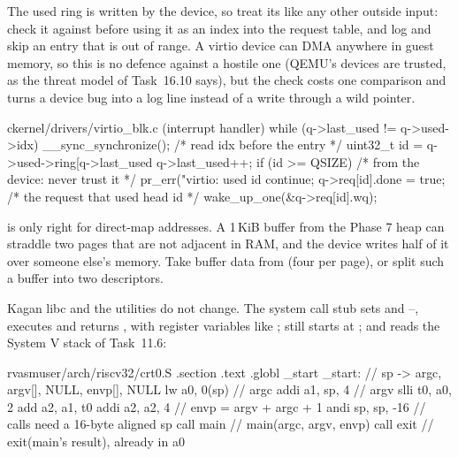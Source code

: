 \documentclass[11pt,a4paper]{article}
\begin{document}
The used ring is written by the device, so treat its  like any other outside input: check it against
 before using it as an index into the request table, and log and skip an entry that is out of range. A
virtio device can DMA anywhere in guest memory, so this is no defence against a hostile one (QEMU's devices are
trusted, as the threat model of Task~16.10 says), but the check costs one comparison and turns a device bug into a log
line instead of a write through a wild pointer.

\begin{lst}{c}{kernel/drivers/virtio_blk.c (interrupt handler)}
while (q->last_used != q->used->idx) {
    __sync_synchronize();                         /* read idx before the entry */
    uint32_t id = q->used->ring[q->last_used %
    q->last_used++;
    if (id >= QSIZE) {                            /* from the device: never trust it */
        pr_err("virtio: used id %
        continue;
    }
    q->req[id].done = true;                       /* the request that used head id */
    wake_up_one(&q->req[id].wq);
}
\end{lst}

\begin{warnbox}
 is only right for direct-map addresses. A 1\,KiB buffer from the Phase 7 heap can straddle two pages
that are not adjacent in RAM, and the device writes half of it over someone else's memory. Take buffer data from
 (four per page), or split such a buffer into two descriptors.
\end{warnbox}

Kagan libc and the utilities do not change. The system call stub sets  and --, executes
 and returns , with register variables like ;  still starts at
; and  reads the System V stack of Task~11.6:

\begin{lst}{rvasm}{user/arch/riscv32/crt0.S}
    .section .text
    .globl _start
_start:                             // sp -> argc, argv[], NULL, envp[], NULL
    lw    a0, 0(sp)                 // argc
    addi  a1, sp, 4                 // argv
    slli  t0, a0, 2
    add   a2, a1, t0
    addi  a2, a2, 4                 // envp = argv + argc + 1
    andi  sp, sp, -16               // calls need a 16-byte aligned sp
    call  main                      // main(argc, argv, envp)
    call  exit                      // exit(main's result), already in a0
\end{lst}
\end{document}
